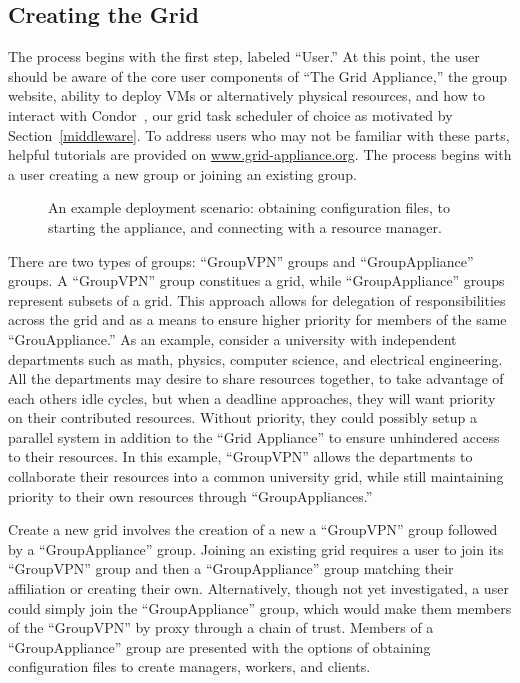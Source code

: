 \documentclass[conference]{IEEEtran}
\begin{document}
\subsection{Creating the Grid}

The process begins with the first step, labeled ``User.'' At this point, the
user should be aware of the core user components of ``The Grid Appliance,'' the
group website, ability to deploy VMs or alternatively physical resources, and
how to interact with Condor~\cite{condor}, our grid task scheduler of choice as
motivated by Section~\ref{middleware}.  To address users who may not be
familiar with these parts, helpful tutorials are provided on
\url{www.grid-appliance.org}.  The process begins with a user creating a new
group or joining an existing group.

\begin{figure}[ht]
\centering
{}
\caption{An example deployment scenario:  obtaining configuration files, to
starting the appliance, and connecting with a resource manager.}
\label{fig:system}
\end{figure}

There are two types of groups:  ``GroupVPN'' groups and ``GroupAppliance''
groups. A ``GroupVPN'' group constitues a grid, while ``GroupAppliance'' groups
represent subsets of a grid.  This approach allows for delegation of
responsibilities across the grid and as a means to ensure higher priority for
members of the same ``GrouAppliance.'' As an example, consider a university
with independent departments such as math, physics, computer science, and
electrical engineering.  All the departments may desire to share resources
together, to take advantage of each others idle cycles, but when a deadline
approaches, they will want priority on their contributed resources.  Without
priority, they could possibly setup a parallel system in addition to the ``Grid
Appliance'' to ensure unhindered access to their resources.  In this example,
``GroupVPN'' allows the departments to collaborate their resources into a
common university grid, while still maintaining priority to their own resources
through ``GroupAppliances.''

Create a new grid involves the creation of a new a ``GroupVPN'' group followed
by a ``GroupAppliance'' group.  Joining an existing grid requires a user to
join its ``GroupVPN'' group and then a ``GroupAppliance'' group matching their
affiliation or creating their own.  Alternatively, though not yet investigated,
a user could simply join the ``GroupAppliance'' group, which would make them
members of the ``GroupVPN'' by proxy through a chain of trust.  Members of a
``GroupAppliance'' group are presented with the options of obtaining
configuration files to create managers, workers, and clients.
\end{document}
